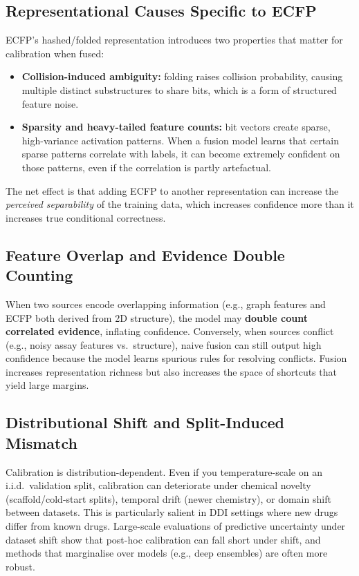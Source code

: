 \documentclass[11pt,a4paper,twocolumn]{article}
\begin{document}
\subsection{Representational Causes Specific to ECFP}
ECFP's hashed/folded representation introduces two properties that matter
for calibration when fused:
\begin{itemize}
\item \textbf{Collision-induced ambiguity:} folding raises collision
      probability, causing multiple distinct substructures to share bits,
      which is a form of structured feature noise.
\item \textbf{Sparsity and heavy-tailed feature counts:} bit vectors
      create sparse, high-variance activation patterns.
      When a fusion model learns that certain sparse patterns correlate
      with labels, it can become extremely confident on those patterns,
      even if the correlation is partly artefactual.
\end{itemize}
The net effect is that adding ECFP to another representation can increase
the \textit{perceived separability} of the training data, which increases
confidence more than it increases true conditional correctness.

\subsection{Feature Overlap and Evidence Double Counting}
When two sources encode overlapping information (e.g., graph features and
ECFP both derived from 2D structure), the model may \textbf{double count
correlated evidence}, inflating confidence.
Conversely, when sources conflict (e.g., noisy assay features vs.\
structure), naive fusion can still output high confidence because the model
learns spurious rules for resolving conflicts.
Fusion increases representation richness but also increases the space of
shortcuts that yield large margins.

\subsection{Distributional Shift and Split-Induced Mismatch}
Calibration is distribution-dependent.
Even if you temperature-scale on an i.i.d.\ validation split, calibration
can deteriorate under chemical novelty (scaffold/cold-start splits),
temporal drift (newer chemistry), or domain shift between datasets.
This is particularly salient in DDI settings where new drugs differ from
known drugs.
Large-scale evaluations of predictive uncertainty under dataset shift show
that post-hoc calibration can fall short under shift, and methods that
marginalise over models (e.g., deep ensembles) are often more robust.
\end{document}
